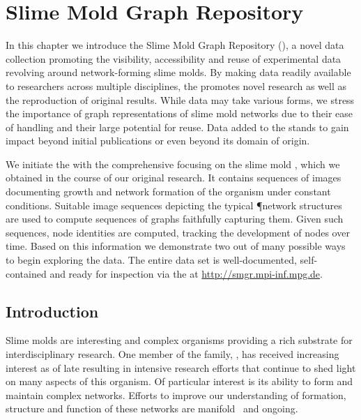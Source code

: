 \chapter{Slime Mold Graph Repository}

	In this chapter we introduce the Slime Mold Graph Repository (\SMGR), a novel data collection promoting the visibility, accessibility and reuse of experimental data revolving around network-forming slime molds. By making data readily available to researchers across multiple disciplines, the \SMGR promotes novel research as well as the reproduction of original results. While \SMGR data may take various forms, we stress the importance of graph representations of slime mold networks due to their ease of handling and their large potential for reuse. Data added to the \SMGR stands to gain impact beyond initial publications or even beyond its domain of origin. 

	We initiate the \SMGR with the comprehensive \data focusing on the slime mold \Pp, which we obtained in the course of our original research. It contains sequences of images documenting growth and network formation of the organism under constant conditions. Suitable image sequences depicting the typical \P network structures are used to compute sequences of graphs faithfully capturing them. Given such sequences, node identities are computed, tracking the development of nodes over time. Based on this information we demonstrate two out of many possible ways to begin exploring the data. The entire data set is well-documented, self-contained and ready for inspection via the \SMGR at \href{http://smgr.mpi-inf.mpg.de}{http://smgr.mpi-inf.mpg.de}.

\section{Introduction}

	Slime molds are interesting and complex organisms providing a rich substrate for interdisciplinary research. One member of the family, \Pp, has received increasing interest as of late resulting in intensive research efforts that continue to shed light on many aspects of this organism. Of particular interest is its ability to form and maintain complex networks. Efforts to improve our understanding of formation, structure and function of these networks are manifold~\cite{Marwan419,tero2010rules,alim2013random,baumgarten2010plasmodial,baumgarten2013functional} and ongoing.

